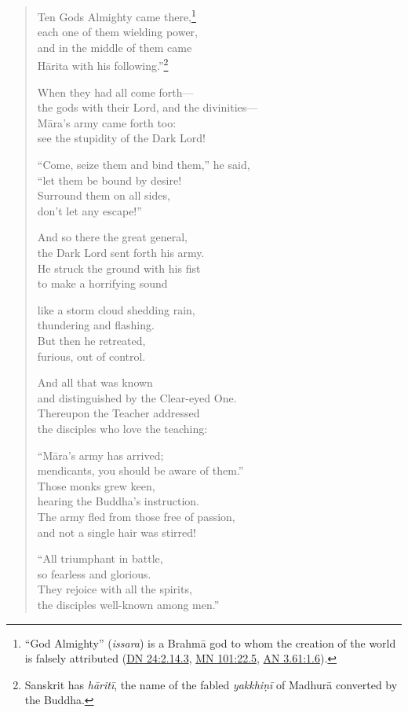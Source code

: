 \documentclass[12pt,openany]{book}%
\begin{document}
\begin{verse}
Ten Gods Almighty came there,\footnote{“God Almighty” (\textit{issara}) is a \textsanskrit{Brahmā} god to whom the creation of the world is falsely attributed (\href{https://suttacentral.net/dn24/en/sujato\#2.14.3}{DN 24:2.14.3}, \href{https://suttacentral.net/mn101/en/sujato\#22.5}{MN 101:22.5}, \href{https://suttacentral.net/an3.61/en/sujato\#1.6}{AN 3.61:1.6}). } \\
each one of them wielding power, \\
and in the middle of them came \\
\textsanskrit{Hārita} with his following.”\footnote{Sanskrit has \textit{\textsanskrit{hāritī}}, the name of the fabled \textit{\textsanskrit{yakkhiṇī}} of \textsanskrit{Madhurā} converted by the Buddha. } 

When they had all come forth—\\
the gods with their Lord, and the divinities—\\
\textsanskrit{Māra}’s army came forth too: \\
see the stupidity of the Dark Lord! 

“Come, seize them and bind them,” he said, \\
“let them be bound by desire! \\
Surround them on all sides, \\
don’t let any escape!” 

And so there the great general, \\
the Dark Lord sent forth his army. \\
He struck the ground with his fist \\
to make a horrifying sound 

like a storm cloud shedding rain, \\
thundering and flashing. \\
But then he retreated, \\
furious, out of control. 

And all that was known \\
and distinguished by the Clear-eyed One. \\
Thereupon the Teacher addressed \\
the disciples who love the teaching: 

“\textsanskrit{Māra}’s army has arrived; \\
mendicants, you should be aware of them.” \\
Those monks grew keen, \\
hearing the Buddha’s instruction. \\
The army fled from those free of passion, \\
and not a single hair was stirred! 

“All triumphant in battle, \\
so fearless and glorious. \\
They rejoice with all the spirits, \\
the disciples well-known among men.” 

%
\end{verse}
\end{document}
